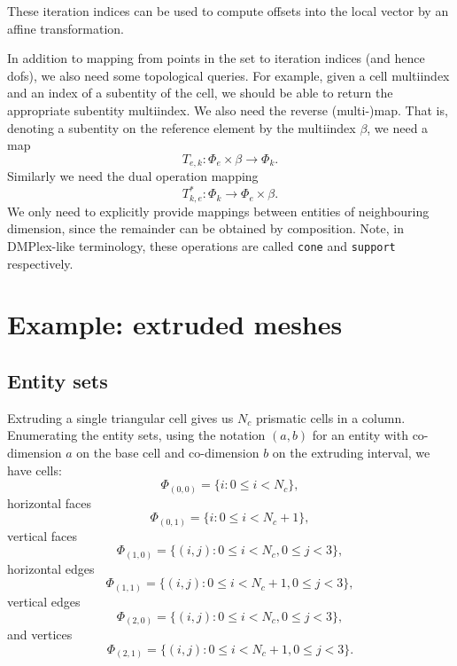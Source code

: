 \documentclass[a4paper,11pt]{article}
\begin{document}
These iteration indices can be used to compute offsets into the local
vector by an affine transformation.

In addition to mapping from points in the set to iteration indices
(and hence dofs), we also need some topological queries. For example,
given a cell multiindex and an index of a subentity of the cell, we
should be able to return the appropriate subentity multiindex. We also
need the reverse (multi-)map. That is, denoting a subentity on the
reference element by the multiindex $\beta$, we need a map
\begin{equation}
  \label{eq:5}
  T_{e,k} : \Phi_e \times \beta \to \Phi_k.
\end{equation}
Similarly we need the dual operation mapping
\begin{equation}
  \label{eq:6}
  T^*_{k,e} : \Phi_k \to \Phi_e \times \beta.
\end{equation}
We only need to explicitly provide mappings between entities of
neighbouring dimension, since the remainder can be obtained by composition.
Note, in DMPlex-like terminology, these operations are called \texttt{cone}
and \texttt{support} respectively.

\section{Example: extruded meshes}
\label{sec:exampl-extr-mesh}

\subsection{Entity sets}
\label{sec:entity-sets}

Extruding a single triangular cell gives us $N_c$ prismatic cells in a
column. Enumerating the entity sets, using the notation $(a, b)$ for
an entity with co-dimension $a$ on the base cell and co-dimension $b$
on the extruding interval, we have cells:
\begin{equation}
  \label{eq:7}
  \Phi_{(0, 0)} = \{i \colon 0 \le i < N_c\},
\end{equation}
horizontal faces
\begin{equation}
  \label{eq:8}
  \Phi_{(0, 1)} = \{i \colon 0 \le i < N_c + 1\},
\end{equation}
vertical faces
\begin{equation}
  \Phi_{(1, 0)} = \{(i,j) \colon 0 \le i < N_c, 0 \le j < 3\},
\end{equation}
horizontal edges
\begin{equation}
  \label{eq:9}
  \Phi_{(1, 1)} = \{(i,j) \colon 0 \le i < N_c+ 1, 0 \le j < 3\},
\end{equation}
vertical edges
\begin{equation}
  \label{eq:10}
  \Phi_{(2, 0)} = \{(i, j) \colon 0 \le i < N_c, 0 \le j < 3\},
\end{equation}
and vertices
\begin{equation}
  \label{eq:11}
  \Phi_{(2, 1)} = \{(i, j) \colon 0 \le i < N_c +1, 0 \le j < 3\}.
\end{equation}
\end{document}
